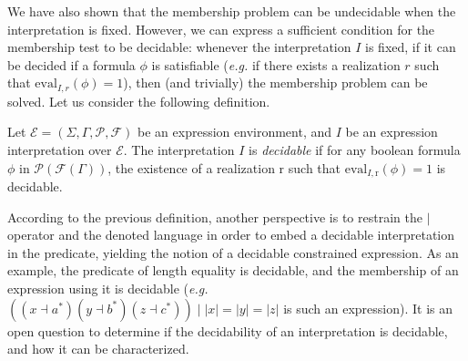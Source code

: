 \documentclass[a4paper]{llncs}
\begin{document}
   We have also shown that the membership problem can be undecidable when the interpretation is fixed. However, we can express a sufficient condition for the membership test to be decidable: whenever the interpretation $I$ is fixed, if it can be decided if a formula $\phi$ is satisfiable (\emph{e.g.} if there exists a realization $r$ such that $\mathrm{eval}_{I,r}(\phi)=1$), then (and trivially) the membership problem can be solved.
   Let us consider the following definition.
   
  \begin{definition}
    Let $\mathcal{E}=(\Sigma,\Gamma,\mathcal{P},\mathcal{F})$ be an expression environment, and $I$ be an expression interpretation over $\mathcal{E}$.
    The interpretation $I$ is \emph{decidable} if for any boolean formula $\phi$ in $\mathcal{P}(\mathcal{F}(\Gamma))$, the existence of a realization $\mathrm{r}$ such that $\mathrm{eval}_{I,\mathrm{r}}(\phi)=1$ is decidable.
  \end{definition}

  According to the previous definition, another perspective is to restrain the $\mid$ operator and the denoted language 
  in order to embed a decidable interpretation in the predicate, yielding the notion of a decidable constrained expression.   
   As an example, the predicate of length equality is decidable, and the membership of an expression using it is decidable (\emph{e.g.} $((x\dashv a^*)(y\dashv b^*)(z\dashv c^*))\mid |x|=|y|=|z|$ is such an expression).
  It is an open question to determine if the decidability of an interpretation is decidable, and how it can be characterized.
  

\end{document}
